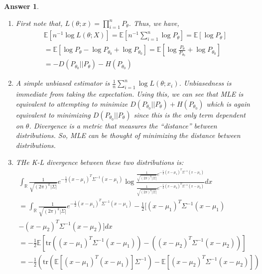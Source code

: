 \documentclass[12pt]{article}
\theoremstyle{colon}
\newtheorem*{answer}{Answer}
\begin{document}
\begin{answer}
  \leavevmode
  \begin{enumerate}[label=\arabic*)]
    \item First note that, $L(\theta; x) = \prod_{i=1}^n P_{\theta}$. Thus, we have,
      \begin{gather*}
        \mathbb{E}[n^{-1} \log L(\theta; X)] = \mathbb{E}[n^{-1} \sum_{i=1}^n \log P_{\theta} ] = \mathbb{E}[ \log P_{\theta} ] \\
        = \mathbb{E}[ \log P_{\theta} - \log P_{\theta_0} + \log P_{\theta_0}] = \mathbb{E}[ \log \frac{P_{\theta}}{P_{\theta_0}} + \log P_{\theta_0}] \\
        = -D(P_{\theta_0} || P_\theta) - H(P_{\theta_0})
      \end{gather*}
    \item A simple unbiased estimator is $\frac{1}{n} \sum_{i=1}^n \log L(\theta; x_i)$. Unbiasedness is immediate from taking the expectation. Using this, we can see that MLE is equivalent to attempting to minimize $D(P_{\theta_0} || P_\theta) + H(P_{\theta_0})$ which is again equivalent to minimizing $D(P_{\theta_0} || P_\theta)$ since this is the only term dependent on $\theta$. Divergence is a metric that measures the ``distance'' between distributions. So, MLE can be thought of minimizing the distance between distributions.
    \item THe K-L divergence between these two distributions is:
      \begin{gather*}
        \int_\mathbb{R} \frac{1}{\sqrt{(2\pi)^k |\Sigma|}} e^{-\frac{1}{2}(x-\mu_1)^T\Sigma^{-1}(x-\mu_1)} \log \frac{\frac{1}{\sqrt{(2\pi)^k |\Sigma|}} e^{-\frac{1}{2}(x-\mu_1)^T\Sigma^{-1}(x-\mu_1)}}{\frac{1}{\sqrt{(2\pi)^k |\Sigma|}} e^{-\frac{1}{2}(x-\mu_2)^T\Sigma^{-1}(x-\mu_2)}} dx \\
        = \int_\mathbb{R} \frac{1}{\sqrt{(2\pi)^k |\Sigma|}} e^{-\frac{1}{2}(x-\mu_1)^T\Sigma^{-1}(x-\mu_1)} -\frac{1}{2} \Big[ (x - \mu_1)^T \Sigma^{-1} (x - \mu_1) \\
         -(x - \mu_2)^T \Sigma^{-1} (x - \mu_2) \Big] dx \\
        = -\frac{1}{2} \mathbb{E} [ \text{tr}\left((x - \mu_1)^T \Sigma^{-1} (x - \mu_1) \right) - \left((x - \mu_2)^T \Sigma^{-1} (x - \mu_2)\right) ] \\
        = -\frac{1}{2} \left( \text{tr}\left(\mathbb{E}[(x - \mu_1)^T (x - \mu_1)] \Sigma^{-1} \right) - \mathbb{E}\left[(x - \mu_2)^T \Sigma^{-1} (x - \mu_2) \right] \right) \\

\end{gather*}
\end{enumerate}
\end{answer}
\end{document}
